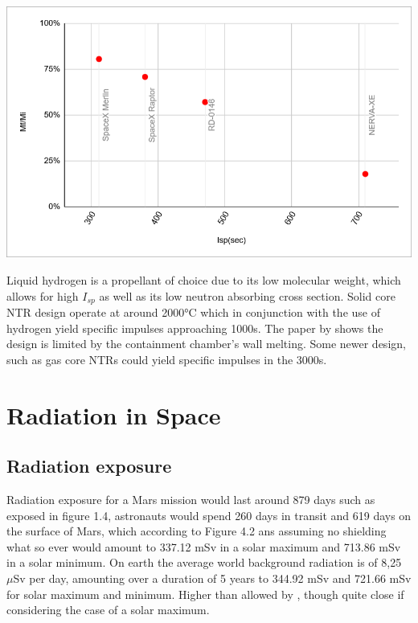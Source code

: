 \documentclass[12pt,a4paper]{report}
\begin{document}
\begin{minipage}[b]{0.49\linewidth}
\centering
\includegraphics[width=1\textwidth]{img/ratio.png}
\end{minipage} 
\hfill
\begin{minipage}[b]{0.45\linewidth}
Liquid hydrogen is a propellant of choice due to its low molecular weight, which allows for high $I_{sp}$ as well as its low neutron absorbing cross section. Solid core NTR design operate at around 2000°C which in conjunction with the use of hydrogen yield specific impulses approaching 1000s. The paper by \citet{mclaren2010} shows the design is limited by the containment chamber's wall melting. Some newer design, such as gas core NTRs could yield specific impulses in the 3000s.
\end{minipage}



\newpage
\section{Radiation in Space}

\subsection{Radiation exposure}

\quad Radiation exposure for a Mars mission would last around 879 days such as exposed in figure 1.4, astronauts would spend 260 days in transit and 619 days on the surface of Mars, which according to Figure 4.2 ans assuming no shielding what so ever would amount to 337.12 mSv in a solar maximum and 713.86 mSv in a solar minimum. On earth the average world background radiation is of 8,25 $\mu$Sv per day, amounting over a duration of 5 years to 344.92 mSv and 721.66 mSv for solar maximum and minimum. Higher than allowed by \citet{IAEA-GSG}, though quite close if considering the case of a solar maximum.\\
\end{document}
